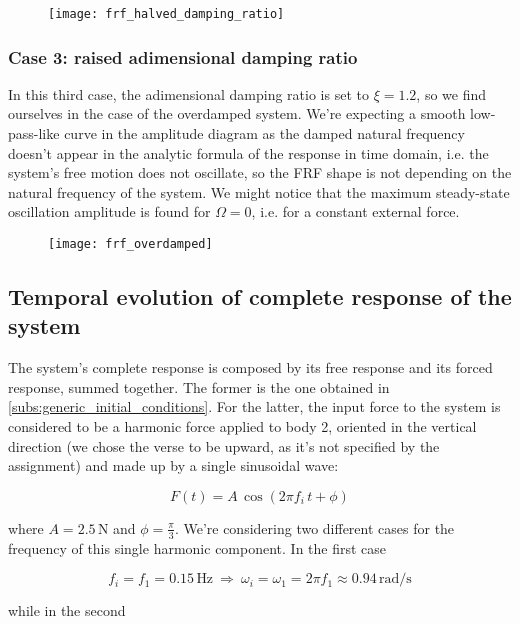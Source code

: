 \documentclass[a4paper,12pt,oneside]{article}
\begin{document}
\begin{figure}[h]
	\hspace{-70pt}
	\texttt{[image: frf\_halved\_damping\_ratio]}
\end{figure}

\subsubsection*{Case 3: raised adimensional damping ratio}

In this third case, the adimensional damping ratio is set to $ \xi = 1.2 $, so we find ourselves in the case of the overdamped system. We're expecting a smooth low-pass-like curve in the amplitude diagram as the damped natural frequency doesn't appear in the analytic formula of the response in time domain, i.e. the system's free motion does not oscillate, so the FRF shape is not depending on the natural frequency of the system. We might notice that the maximum steady-state oscillation amplitude is found for $ \Omega = 0 $, i.e. for a constant external force.

\begin{figure}[H]
	\hspace{-70pt}
	\texttt{[image: frf\_overdamped]}
\end{figure}

\subsection{Temporal evolution of complete response of the system}

The system's complete response is composed by its free response and its forced response, summed together. The former is the one obtained in \ref{subs:generic_initial_conditions}. For the latter, the input force to the system is considered to be a harmonic force applied to body 2, oriented in the vertical direction (we chose the verse to be upward, as it's not specified by the assignment) and made up by a single sinusoidal wave:

\[ F(t) = A \, \cos(2 \pi f_i \, t + \phi) \]

where $ A = 2.5 \, \text{N} $ and $ \phi = \frac{\pi}{3} $. We're considering two different cases for the frequency of this single harmonic component. In the first case

\[
	f_i = f_1 = 0.15 \, \text{Hz} ~ \Rightarrow ~
		\omega_i = \omega_1 = 2 \pi f_1 \approx 0.94 \, \text{rad/s}
\]

while in the second
\end{document}

